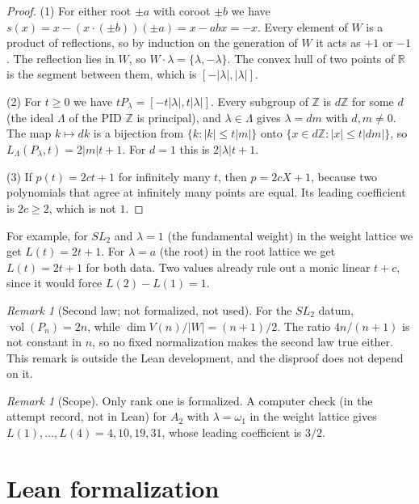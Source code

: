 \documentclass[11pt]{article}
\theoremstyle{remark}
\newtheorem{remark}[theorem]{Remark}
\theoremstyle{definition}
\begin{document}
\begin{proof}
(1) For either root $\pm a$ with coroot $\pm b$ we have
$s(x) = x - (x\cdot(\pm b))(\pm a) = x - abx = -x$. Every element of $W$ is a product of reflections,
so by induction on the generation of $W$ it acts as $+1$ or $-1$. The reflection lies in $W$, so
$W\cdot\lambda = \{\lambda,-\lambda\}$. The convex hull of two points of $\mathbb{R}$ is the segment
between them, which is $[-|\lambda|,|\lambda|]$.

(2) For $t\ge 0$ we have $tP_\lambda = [-t|\lambda|, t|\lambda|]$. Every subgroup of $\mathbb{Z}$ is
$d\mathbb{Z}$ for some $d$ (the ideal $\Lambda$ of the PID $\mathbb{Z}$ is principal), and
$\lambda\in\Lambda$ gives $\lambda = dm$ with $d,m\ne0$. The map $k\mapsto dk$ is a bijection from
$\{k : |k|\le t|m|\}$ onto $\{x\in d\mathbb{Z} : |x|\le t|dm|\}$, so
$L_\Lambda(P_\lambda,t) = 2|m|t+1$. For $d = 1$ this is $2|\lambda|t+1$.

(3) If $p(t) = 2ct+1$ for infinitely many $t$, then $p = 2cX + 1$, because two polynomials that agree
at infinitely many points are equal. Its leading coefficient is $2c\ge 2$, which is not $1$.
\end{proof}

For example, for $SL_2$ and $\lambda = 1$ (the fundamental weight) in the weight lattice we get
$L(t) = 2t+1$. For $\lambda = a$ (the root) in the root lattice we get $L(t) = 2t+1$ for both data.
Two values already rule out a monic linear $t+c$, since it would force $L(2)-L(1) = 1$.

\begin{remark}[Second law; not formalized, not used]\label{rem:clause2}
For the $SL_2$ datum, $\operatorname{vol}(P_n) = 2n$, while $\dim V(n)/|W| = (n+1)/2$. The ratio
$4n/(n+1)$ is not constant in $n$, so no fixed normalization makes the second law true either. This
remark is outside the Lean development, and the disproof does not depend on it.
\end{remark}

\begin{remark}[Scope]
Only rank one is formalized. A computer check (in the attempt record, not in Lean) for $A_2$ with
$\lambda = \omega_1$ in the weight lattice gives $L(1),\dots,L(4) = 4,10,19,31$, whose leading
coefficient is $3/2$.
\end{remark}

\section{Lean formalization}
\end{document}
